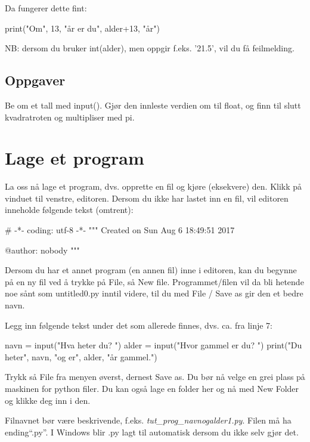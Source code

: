 {Da fungerer dette fint: 

\begin{usncodebox}
print("Om", 13, "år er du", alder+13, "år") 
\end{usncodebox}

NB: dersom du bruker int(alder), men oppgir f.eks. '21.5', vil du få feilmelding. 

\subsection{Oppgaver}

\begin{question}
Be om et tall med input(). Gjør den innleste verdien om til float, og finn til slutt kvadratroten og multipliser med pi. 
\end{question}

\section{Lage et program}

La oss nå lage et program, dvs. opprette en fil og kjøre (eksekvere) den.  Klikk på vinduet til venstre, editoren.  Dersom du ikke har lastet inn en fil, vil editoren inneholde følgende tekst (omtrent): 

\begin{usncodebox}
# -*- coding: utf-8 -*-
"""
Created on Sun Aug  6 18:49:51 2017

@author: nobody
"""
\end{usncodebox}

Dersom du har et annet program (en annen fil) inne i editoren, kan du begynne på en ny fil ved å trykke på File, så New file. Programmet/filen vil da bli hetende noe sånt som untitled0.py inntil videre, til du med File / Save as gir den et bedre navn. 

Legg inn følgende tekst under det som allerede finnes, dvs. ca. fra linje 7: 

\begin{usncodebox}
navn = input("Hva heter du? ")
alder = input("Hvor gammel er du? ") 
print("Du heter", navn, "og er", alder, "år gammel.") 
\end{usncodebox}

Trykk så File fra menyen øverst, dernest Save as. Du bør nå velge en grei plass på maskinen for python filer. Du kan også lage en folder her og nå med New Folder og klikke deg inn i den.

Filnavnet bør være beskrivende, f.eks. \emph{tut\_{}prog\_{}navnogalder1.py}. Filen må ha ending``.py''. I Windows blir .py lagt til automatisk dersom du ikke selv gjør det. 

}
